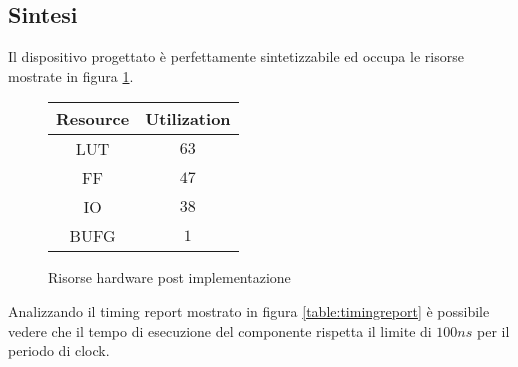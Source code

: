 \subsection{Sintesi}

Il dispositivo progettato è perfettamente sintetizzabile ed occupa le risorse mostrate in figura \ref{table:risorse}.

\begin{figure}[!ht]
    \centering
    \begin{tabular}{|c | c |}
        \hline
        Resource & Utilization \\
        \hline
        LUT      & $63$        \\
        \hline
        FF       & $47$        \\
        \hline
        IO       & $38$        \\
        \hline
        BUFG     & $1$         \\
        \hline
    \end{tabular}
    \caption{Risorse hardware post implementazione}
    \label{table:risorse}
\end{figure}

Analizzando il timing report mostrato in figura \ref{table:timingreport} è possibile vedere che il tempo di esecuzione del componente rispetta il limite di $100ns$ per il periodo di clock.

